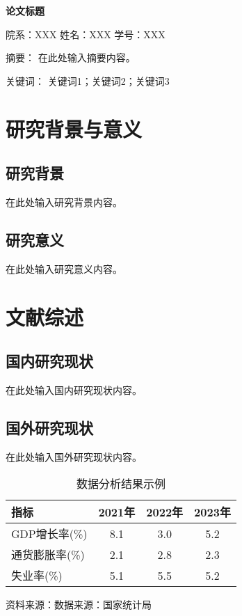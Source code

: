 \documentclass[a4paper,AutoFakeBold]{article}
\newcommand{\source}[1]{%
    \vspace{2pt}%
    \par\noindent\small\kaishu 资料来源：#1%
    \vspace{6pt}%
}
\let\oldtableofcontents\tableofcontents
\renewcommand{\tableofcontents}{%
    \fancyhead[C]{\songti\zihao{5} \textbf{论文标题}}
    \oldtableofcontents
}
\begin{document}
\thispagestyle{empty}

\begin{center}
    \heiti\bfseries{论文标题}
    \vspace{20pt}
\end{center}

\begin{center}
    \songti
    院系：XXX \quad 姓名：XXX \quad 学号：XXX
    \vspace{30pt}
\end{center}

\vspace{10pt}
\noindent{}\heiti 摘要：
\songti
在此处输入摘要内容。

\vspace{10pt}
\noindent{}\heiti 关键词：
\songti
关键词1；关键词2；关键词3

\newpage
\tableofcontents
\newpage

\section{研究背景与意义}
\subsection{研究背景}
在此处输入研究背景内容。

\subsection{研究意义}
在此处输入研究意义内容。

\section{文献综述}
\subsection{国内研究现状}
在此处输入国内研究现状内容。

\subsection{国外研究现状}
在此处输入国外研究现状内容。

\begin{table}[H]
    \centering
    \caption{数据分析结果示例}
    \label{tab:example}
    \begin{tabular}{lccc}
        \toprule
        指标 & 2021年 & 2022年 & 2023年 \\
        \midrule
        GDP增长率(\%) & 8.1 & 3.0 & 5.2 \\
        通货膨胀率(\%) & 2.1 & 2.8 & 2.3 \\
        失业率(\%) & 5.1 & 5.5 & 5.2 \\
        \bottomrule
    \end{tabular}
    \source{数据来源：国家统计局}
\end{table}
\end{document}
